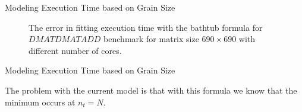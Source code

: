 \documentclass[10pt]{beamer}
\begin{document}
\begin{frame}{Modeling Execution Time based on Grain Size}
	\begin{outline}	
\begin{figure}[H]
	\caption{The error in fitting execution time with the bathtub formula for $DMATDMATADD$ benchmark for matrix size $690\times690$ with different number of cores.}	
	\label{fig25}
\end{figure}
\end{outline}
\end{frame}

\begin{frame}{Modeling Execution Time based on Grain Size}
	\begin{outline}	
The problem with the current model is that with this formula we know that the minimum occurs at $n_t=N$.

\end{outline}
\end{frame}


\end{document}
